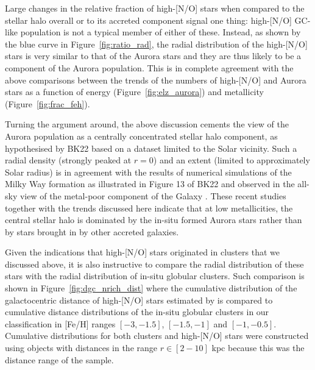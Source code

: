 \documentclass[a4paper,useAMS,usenatbib]{mnras}
\begin{document}
Large changes in the relative fraction of high-[N/O] stars when compared to the stellar halo overall or to its accreted component signal one thing: high-[N/O] GC-like population is not a typical member of either of these. Instead, as shown by the blue curve in Figure~\ref{fig:ratio_rad}, the radial distribution of the high-[N/O] stars is very similar to that of the Aurora stars and they are thus likely to be a component of the Aurora population. This is in complete agreement with the above comparisons between the trends of the numbers of high-[N/O] and Aurora stars as a function of energy (Figure~\ref{fig:elz_aurora}) and metallicity (Figure~\ref{fig:frac_feh}). 

Turning the argument around, the above discussion cements the view of the Aurora population as a centrally concentrated stellar halo component, as hypothesised by BK22 based on a dataset limited to the Solar vicinity. Such a radial density (strongly peaked at $r=0$) and an extent (limited to approximately Solar radius) is in agreement with the results of numerical simulations of the Milky Way formation as illustrated in Figure 13 of BK22 and observed in the all-sky view of the metal-poor component of the Galaxy \citep[see][]{Rix2022}. These recent studies \citep[see also][]{Conroy2022,Myeong2022} together with the trends discussed here indicate that at low metallicities, the central stellar halo is dominated by the in-situ formed Aurora stars rather than by stars brought in by other accreted galaxies.

Given the indications that high-[N/O] stars originated in clusters that we discussed above, it is also instructive to compare the radial distribution of these stars with the radial distribution of in-situ globular clusters. Such comparison is shown in Figure~\ref{fig:dgc_nrich_dist} where the cumulative
distribution of the galactocentric distance of high-[N/O] stars estimated by \citet{Horta2021} is compared to cumulative distance distributions of the in-situ globular clusters in our classification in [Fe/H] ranges $[-3,-1.5]$, $[-1.5,-1]$ and $[-1,-0.5]$. Cumulative distributions for both clusters and high-[N/O] stars were constructed using objects with distances in the range $r\in[2-10]$ kpc because this was the distance range of the \citet{Horta2021} sample.
\end{document}
